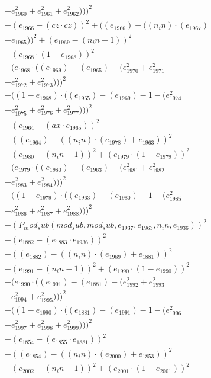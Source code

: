 \documentclass[10pt, a4paper]{article}
\begin{document}
\begin{small}
\begin{align*}
& + e_{1960}^{2} + e_{1961}^{2} + e_{1962}^{2})))^{2} \\
& + (e_{1966} - (cz  \cdot  cz))^{2} + ((e_{1966}) - ((n_in)  \cdot  (e_{1967}) \\
& + e_{1965}))^{2} + (e_{1969} - (n_in - 1))^{2} \\
& + (e_{1968}  \cdot  (1 - e_{1968}))^{2} \\
& + (e_{1968}  \cdot  ((e_{1969}) - (e_{1965}) - (e_{1970}^{2} + e_{1971}^{2} \\
& + e_{1972}^{2} + e_{1973}^{2})))^{2} \\
& + ((1 - e_{1968})  \cdot  ((e_{1965}) - (e_{1969}) - 1 - (e_{1974}^{2} \\
& + e_{1975}^{2} + e_{1976}^{2} + e_{1977}^{2})))^{2} \\
& + (e_{1964} - (ax  \cdot  e_{1965}))^{2} \\
& + ((e_{1964}) - ((n_in)  \cdot  (e_{1978}) + e_{1963}))^{2} \\
& + (e_{1980} - (n_in - 1))^{2} + (e_{1979}  \cdot  (1 - e_{1979}))^{2} \\
& + (e_{1979}  \cdot  ((e_{1980}) - (e_{1963}) - (e_{1981}^{2} + e_{1982}^{2} \\
& + e_{1983}^{2} + e_{1984}^{2})))^{2} \\
& + ((1 - e_{1979})  \cdot  ((e_{1963}) - (e_{1980}) - 1 - (e_{1985}^{2} \\
& + e_{1986}^{2} + e_{1987}^{2} + e_{1988}^{2})))^{2} \\
& + (P_mod_sub(mod_sub, mod_sub, e_{1937}, e_{1963}, n_in, e_{1936}))^{2} \\
& + (e_{1882} - (e_{1883}  \cdot  e_{1936}))^{2} \\
& + ((e_{1882}) - ((n_in)  \cdot  (e_{1989}) + e_{1881}))^{2} \\
& + (e_{1991} - (n_in - 1))^{2} + (e_{1990}  \cdot  (1 - e_{1990}))^{2} \\
& + (e_{1990}  \cdot  ((e_{1991}) - (e_{1881}) - (e_{1992}^{2} + e_{1993}^{2} \\
& + e_{1994}^{2} + e_{1995}^{2})))^{2} \\
& + ((1 - e_{1990})  \cdot  ((e_{1881}) - (e_{1991}) - 1 - (e_{1996}^{2} \\
& + e_{1997}^{2} + e_{1998}^{2} + e_{1999}^{2})))^{2} \\
& + (e_{1854} - (e_{1855}  \cdot  e_{1881}))^{2} \\
& + ((e_{1854}) - ((n_in)  \cdot  (e_{2000}) + e_{1853}))^{2} \\
& + (e_{2002} - (n_in - 1))^{2} + (e_{2001}  \cdot  (1 - e_{2001}))^{2} \\

\end{align*}
\end{small}
\end{document}
